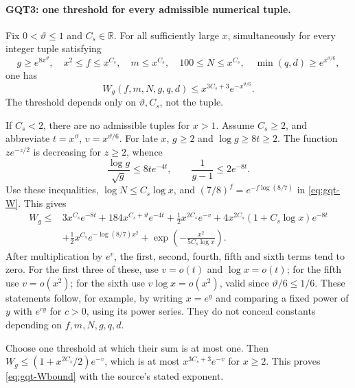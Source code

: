 \documentclass[11pt,a4paper]{article}
\numberwithin{equation}{section}
\theoremstyle{remark}\newtheorem{remark}[theorem]{Remark}
\begin{document}
\paragraph{GQT3: one threshold for every admissible numerical tuple.}
\label{claim:GQT3}
Fix $0<\vartheta\le1$ and $C_s\in\mathbb R$. For all sufficiently
large $x$, simultaneously for every integer tuple satisfying
\begin{equation}\label{eq:gqt-sizes}
 g\ge e^{8x^\vartheta},\quad x^2\le f\le x^{C_s},\quad
 m\le x^{C_s},\quad100\le N\le x^{C_s},\quad
 \min(q,\allowbreak{} d)\ge e^{x^{\vartheta/6}},
\end{equation}
one has
\begin{equation}\label{eq:gqt-Wbound}
         W_g(f,\allowbreak{} m,\allowbreak{} N,\allowbreak{} g,\allowbreak{} q,\allowbreak{} d)
       \le x^{3C_s+3}e^{-x^{\vartheta/6}}.
\end{equation}
The threshold depends only on $\vartheta,\allowbreak{} C_s$, not the tuple.

If $C_s<2$, there are no admissible tuples for $x>1$. Assume
$C_s\ge2$, and abbreviate $t=x^\vartheta$, $v=x^{\vartheta/6}$.
For late $x$, $g\ge2$ and $\log g\ge8t\ge2$.
The function $z e^{-z/2}$ is decreasing for $z\ge2$, whence
\[
 \frac{\log g}{\sqrt g}\le8t e^{-4t},\qquad
 \frac1{g-1}\le2e^{-8t}.
\]
Use these inequalities, $\log N\le C_s\log x$,
and $(7/8)^f=e^{-f\log(8/7)}$ in \eqref{eq:gqt-W}. This gives
\begin{align*}
 W_g\le{}&3x^{C_s}e^{-8t}
       +184x^{C_s+\vartheta}e^{-4t}
       +\tfrac12x^{2C_s}e^{-v}
       +4x^{2C_s}(1+C_s\log x)e^{-8t}\\
       &+\tfrac12x^{C_s}e^{-\log(8/7)x^2}
       +\exp\left(-\frac{x^2}{5C_s\log x}\right).
\end{align*}
After multiplication by $e^v$, the first, second, fourth, fifth
and sixth terms tend to zero. For the first three of these, use
$v=o(t)$ and $\log x=o(t)$; for the fifth use $v=o(x^2)$;
for the sixth use $v\log x=o(x^2)$, valid since
$\vartheta/6\le1/6$. These statements follow, for example, by
writing $x=e^y$ and comparing a fixed power of $y$ with
$e^{cy}$ for $c>0$, using its power series. They do not conceal
constants depending on $f,\allowbreak{} m,\allowbreak{} N,\allowbreak{} g,\allowbreak{} q,\allowbreak{} d$.

Choose one threshold at which their sum is at most one. Then
$W_g\le(1+x^{2C_s}/2)e^{-v}$, which is at most
$x^{3C_s+3}e^{-v}$ for $x\ge2$. This proves
\eqref{eq:gqt-Wbound} with the source's stated exponent.
\end{document}
